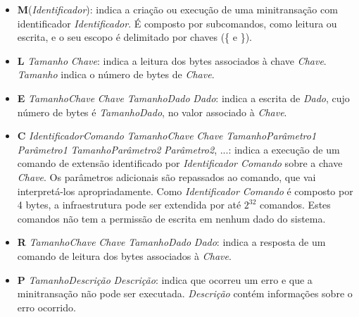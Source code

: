 \documentclass[11pt,twoside,a4paper]{book}
\begin{document}
\begin{itemize}
\item \textbf{M}(\textit{Identificador}): indica a criação ou execução de uma minitransação com identificador \textit{Identificador}. É composto por subcomandos, como leitura ou escrita, e o seu escopo é delimitado por chaves (\{ e \}).

\item \textbf{L} \textit{Tamanho} \textit{Chave}: indica a leitura dos bytes associados à chave \textit{Chave}. \textit{Tamanho} indica o número de bytes de \textit{Chave}.

\item \textbf{E} \textit{TamanhoChave} \textit{Chave} \textit{TamanhoDado} \textit{Dado}: indica a escrita de \textit{Dado}, cujo número de bytes é \textit{TamanhoDado}, no valor associado à \textit{Chave}.

\item \textbf{C} \textit{IdentificadorComando} \textit{TamanhoChave} \textit{Chave} \textit{TamanhoParâmetro1} \textit{Parâmetro1} \textit{TamanhoParâmetro2} \textit{Parâmetro2}, ...: indica a execução de um comando de extensão identificado por \textit{Identificador Comando} sobre a chave \textit{Chave}. Os parâmetros adicionais são repassados ao comando, que vai interpretá-los apropriadamente. Como \textit{Identificador Comando} é composto por 4 bytes, a infraestrutura pode ser extendida por até $2^{32}$ comandos. Estes comandos não tem a permissão de escrita em nenhum dado do sistema.



\item \textbf{R} \textit{TamanhoChave} \textit{Chave} \textit{TamanhoDado} \textit{Dado}: indica a resposta de um comando de leitura dos bytes associados à \textit{Chave}.

\item \textbf{P} \textit{TamanhoDescrição} \textit{Descrição}: indica que ocorreu um erro e que a minitransação não pode ser executada. \textit{Descrição} contém informações sobre o erro ocorrido.


\end{itemize}
\end{document}

